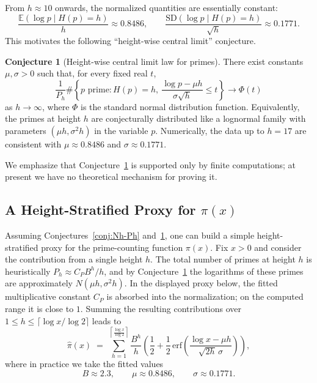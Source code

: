 \documentclass[11pt]{article}
\providecommand{\texorpdfstring}[2]{#1}
\theoremstyle{definition}
\newtheorem{conjecture}{Conjecture}
\begin{document}
From $h\approx 10$ onwards, the normalized quantities are essentially
constant:
\[
  \frac{\mathbb{E}(\log p \mid H(p)=h)}{h}
  \approx 0.8486,\qquad
  \frac{\mathrm{SD}(\log p \mid H(p)=h)}{\sqrt{h}}
  \approx 0.1771.
\]
This motivates the following ``height-wise central limit'' conjecture.

\begin{conjecture}[Height-wise central limit law for primes]
\label{conj:lognormal}
There exist constants $\mu,\sigma>0$ such that, for every fixed real $t$,
\[
  \frac{1}{P_h}
  \#\left\{
    p\text{ prime}: H(p)=h,\ 
    \frac{\log p-\mu h}{\sigma\sqrt h}\le t
  \right\}
  \longrightarrow
  \Phi(t)
\]
as $h\to\infty$, where $\Phi$ is the standard normal distribution function.
Equivalently, the primes at height $h$ are conjecturally distributed like a
lognormal family with parameters $(\mu h,\sigma^2h)$ in the variable $p$.
Numerically, the data up to $h=17$ are consistent with
$\mu\approx0.8486$ and $\sigma\approx0.1771$.
\end{conjecture}

We emphasize that Conjecture~\ref{conj:lognormal} is supported only by finite
computations; at present we have no theoretical mechanism for proving it.

\subsection{A Height-Stratified Proxy for \texorpdfstring{$\pi(x)$}{pi(x)}}

Assuming Conjectures~\ref{conj:Nh-Ph} and~\ref{conj:lognormal}, one can build a
simple height-stratified proxy for the prime-counting function $\pi(x)$.
Fix $x>0$ and consider the contribution from a single height $h$.  The total
number of primes at height $h$ is heuristically $P_h\approx C_PB^h/h$, and by
Conjecture~\ref{conj:lognormal} the logarithms of these primes are
approximately $N(\mu h,\sigma^2 h)$.  In the displayed proxy below, the fitted
multiplicative constant $C_P$ is absorbed into the normalization; on the
computed range it is close to $1$.  Summing the resulting contributions over
$1\le h\le \lceil \log x/\log 2\rceil$ leads to
\begin{equation}\label{primefit}
  \hat{\pi}(x)
  \;=\;
  \sum_{h=1}^{\left\lceil{\frac{\log x}{\log 2}}\right\rceil}
    \frac{B^{h}}{h}
    \left(
      \frac{1}{2}
      + \frac{1}{2}\,\mathrm{erf}\!\left(
        \frac{\log x - \mu h}{\sqrt{2h}\,\sigma}
      \right)
    \right),
\end{equation}
where in practice we take the fitted values
\[
  B\approx 2.3,\qquad \mu\approx 0.8486,\qquad \sigma\approx 0.1771.
\]
\end{document}
